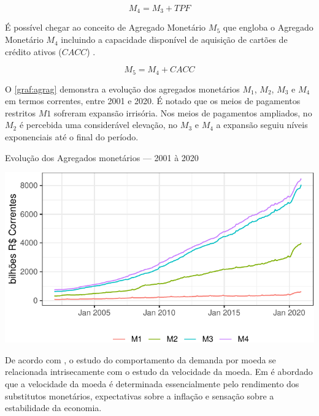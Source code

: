 \documentclass[
  12pt,
  12pt,
  openright,
  oneside,
  a4paper,
  chapter=TITLE,
  section=TITLE,
  subsection=TITLE,
  subsubsection=TITLE,
  portugues,
  sumario=tradicional]{abntex2}
\begin{document}
\begin{equation}
M_4 = M_3 + TPF
\end{equation}

É possível chegar ao conceito de Agregado Monetário \(M_5\) que engloba o Agregado Monetário \(M_4\) incluindo a capacidade disponível de aquisição de cartões de crédito ativos (\(CACC\)) \cite{cordoba:1996}.

\begin{equation}
M_5 = M_4 + CACC
\end{equation}

O \autoref{graf:agrag} demonstra a evolução dos agregados monetários \(M_1\), \(M_2\), \(M_3\) e \(M_4\) em termos correntes, entre 2001 e 2020. É notado que os meios de pagamentos restritos \(M1\) sofreram expansão irrisória. Nos meios de pagamentos ampliados, no \(M_2\) é percebida uma considerável elevação, no \(M_3\) e \(M_4\) a expansão seguiu níveis exponenciais até o final do período.

\begin{grafico}[!hbtp]
\vspace{20pt}
\caption{Evolução dos Agregados monetários — 2001 à 2020}
\vspace{-4mm}

\begin{center}\includegraphics{12-exportedfigures/m2m3m4-1} \end{center}
\vspace{-3mm}
\label{graf:agrag}
\vspace{-2mm}
\end{grafico}

De acordo com \textcite{friedman:1982}, o estudo do comportamento da demanda por moeda se relacionada intrisecamente com o estudo da velocidade da moeda. Em \textcite{friedman:1963} é abordado que a velocidade da moeda é determinada essencialmente pelo rendimento dos substitutos monetários, expectativas sobre a inflação e sensação sobre a estabilidade da economia.
\end{document}
